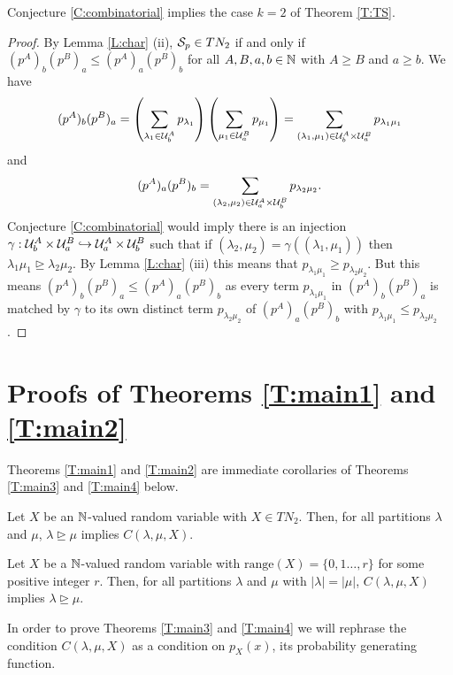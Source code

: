 \documentclass[12pt]{article}
\newcommand{\range}{\text{range}}
\begin{document}
\begin{theorem} Conjecture \ref{C:combinatorial} implies the case $k=2$ of Theorem \ref{T:TS}. 
\end{theorem}
\begin{proof}  By Lemma \ref{L:char} (ii), ${\cal S}_p \in TN_2$ if and only if $(p^A)_b (p^B)_a \leq (p^A)_a (p^B)_b$ for all $A, B, a, b \in \mathbb{N}$ with $A \geq B$ and $a \geq b$.  We have \[(p^A)_b (p^B)_a = \left(\sum_{\lambda_1 \in {\cal U}^A_b} p_{\lambda_1} \right)\left(\sum_{\mu_1 \in {\cal U}^B_a} p_{\mu_1}\right) = \sum_{(\lambda_1,\mu_1) \in {\cal U}^A_b \times {\cal U}^B_a} p_{\lambda_1 \mu_1}\]
and
\[(p^A)_a (p^B)_b = \sum_{(\lambda_2,\mu_2) \in {\cal U}^A_a \times {\cal U}^B_b} p_{\lambda_2\mu_2}.\]
Conjecture \ref{C:combinatorial} would imply there is an injection $\gamma : {\cal U}^A_b \times {\cal U}^B_a \hookrightarrow {\cal U}^A_a \times {\cal U}^B_b$ such that if $(\lambda_2, \mu_2) = \gamma((\lambda_1,\mu_1))$ then $\lambda_1 \mu_1 \trianglerighteq \lambda_2 \mu_2$.  By Lemma \ref{L:char} (iii) this means that $p_{\lambda_1 \mu_1} \geq p_{\lambda_2 \mu_2}$.  But this means $(p^A)_b (p^B)_a \leq (p^A)_a (p^B)_b$ as every term $p_{\lambda_1\mu_1}$ in $(p^A)_b (p^B)_a$ is matched by $\gamma$ to its own distinct term $p_{\lambda_2\mu_2}$ of $(p^A)_a (p^B)_b$ with $p_{\lambda_1\mu_1} \leq p_{\lambda_2\mu_2}$.
\end{proof}


\section{Proofs of Theorems \ref{T:main1} and \ref{T:main2}} \label{S:main}

Theorems \ref{T:main1} and \ref{T:main2} are immediate corollaries of Theorems \ref{T:main3} and \ref{T:main4} below.


\begin{theorem} \label{T:main3}
Let $X$ be an $\mathbb{N}$-valued random variable with $X \in TN_2$. Then, for all partitions $\lambda$ and $\mu$, $\lambda \trianglerighteq \mu$ implies $C(\lambda,\mu,X)$.
\end{theorem}

\begin{theorem} \label{T:main4}
Let $X$ be a $\mathbb{N}$-valued random variable with $\range(X) = \{0,1\ldots,r\}$ for some positive integer $r$. Then, for all partitions $\lambda$ and $\mu$ with $|\lambda| = |\mu|$, $C(\lambda,\mu,X)$ implies $\lambda \trianglerighteq \mu$.
\end{theorem}

In order to prove Theorems \ref{T:main3} and \ref{T:main4} we will rephrase the condition $C(\lambda,\mu,X)$ as a condition on $p_X(x)$, its probability generating function.
\end{document}
